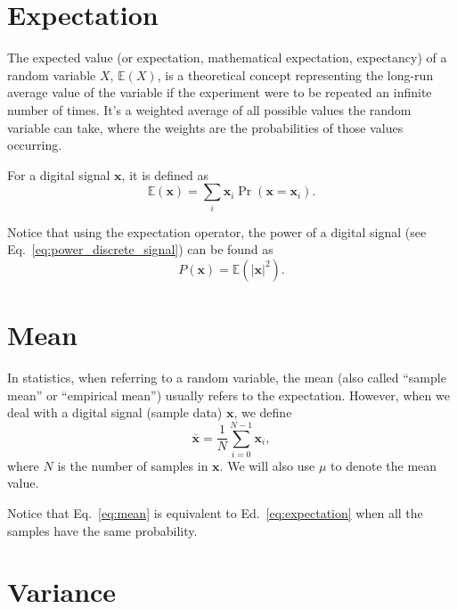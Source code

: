 
\section{Expectation}
The expected value (or expectation, mathematical expectation,
expectancy) of a random variable $X$, $\mathbb{E}(X)$, is a
theoretical concept representing the long-run average value of the
variable if the experiment were to be repeated an infinite number of
times. It's a weighted average of all possible values the random
variable can take, where the weights are the probabilities of those
values occurring.

For a digital signal $\mathbf{x}$, it is defined as
\begin{equation}
  \mathbb{E}(\mathbf{x})=\sum_i\mathbf{x}_i\Pr(\mathbf{x}=\mathbf{x}_i).
  \label{eq:expectation}
\end{equation}

Notice that using the expectation operator, the power of a digital
signal (see Eq.~\ref{eq:power_discrete_signal}) can be found as
\begin{equation}
  P(\mathbf{x}) = \mathbb{E}(|\mathbf{x}|^2).
  \label{eq:power_as_expectation}
\end{equation}

\section{Mean}
\label{sec:mean}
In statistics, when referring to a random variable, the mean (also
called ``sample mean'' or ``empirical mean'') usually refers to the
expectation. However, when we deal with a digital signal (sample data)
$\mathbf{x}$, we define
\begin{equation}
  \overline{\mathbf{x}} = \frac{1}{N}\sum_{i=0}^{N-1}\mathbf{x}_i,
  \label{eq:mean}
\end{equation}
where $N$ is the number of samples in $\mathbf{x}$. We will also use
$\mu$ to denote the mean value.

Notice that Eq.~\ref{eq:mean} is equivalent to
Ed.~\ref{eq:expectation} when all the samples have the same
probability.

\section{Variance}
\label{sec:variance}

